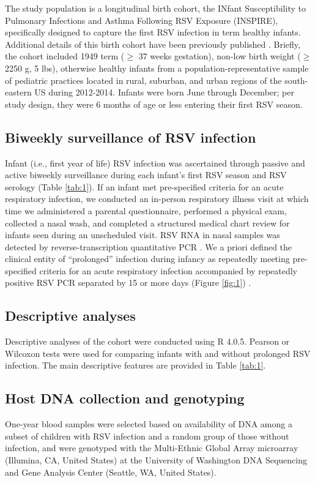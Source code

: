 \documentclass{article} %
\begin{document}
The study population is a longitudinal birth cohort, the INfant Susceptibility to Pulmonary Infections and Asthma Following RSV Exposure (INSPIRE), specifically designed to capture the first RSV infection in term healthy infants. Additional details of this birth cohort have been previously published 
\citep{larkin_objectives_2015}. 
Briefly, the cohort included 1949 term ($\ge$ 37 weeks gestation), non-low birth weight ($\ge$ 2250 g, 5 lbs), otherwise healthy infants from a population-representative sample of pediatric practices located in rural, suburban, and urban regions of the south-eastern US during 2012-2014. 
Infants were born June through December; per study design, they were 6 months of age or less entering their first RSV season.

\subsection{Biweekly surveillance of RSV infection}
Infant (i.e., first year of life) RSV infection was ascertained through passive and active biweekly surveillance during each infant’s first RSV season and RSV serology (Table \ref{tab:1}). 
If an infant met pre-specified criteria for an acute respiratory infection, we conducted an in-person respiratory illness visit at which time we administered a parental questionnaire, performed a physical exam, collected a nasal wash, and completed a structured medical chart review for infants seen during an unscheduled visit. RSV RNA in nasal samples was detected by reverse-transcription quantitative PCR 
\citep{larkin2015objectives}. 
We a priori defined the clinical entity of “prolonged” infection during infancy as repeatedly meeting pre-specified criteria for an acute respiratory infection accompanied by repeatedly positive RSV PCR separated by 15 or more days (Figure \ref{fig:1}) 
\citep{okiro2010duration}.

\subsection{Descriptive analyses}
Descriptive analyses of the cohort were conducted using R 4.0.5. 
Pearson or Wilcoxon tests were used for comparing infants with and without prolonged RSV infection. 
The main descriptive features are provided in Table \ref{tab:1}.

\subsection{Host DNA collection and genotyping}
One-year blood samples were selected based on availability of DNA among a subset of children with RSV infection and a random group of those without infection, and were genotyped with the Multi-Ethnic Global Array microarray (Illumina, CA, United States) at the University of Washington DNA Sequencing and Gene Analysis Center (Seattle, WA, United States).
\end{document}
